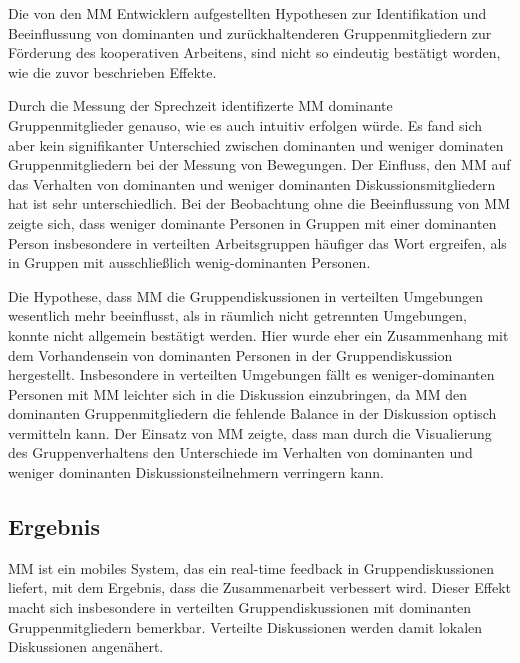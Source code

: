 Die von den MM Entwicklern aufgestellten Hypothesen zur Identifikation und
Beeinflussung von dominanten und zurückhaltenderen Gruppenmitgliedern zur
Förderung des kooperativen Arbeitens, sind nicht so eindeutig bestätigt worden,
wie die zuvor beschrieben Effekte.

Durch die Messung der Sprechzeit identifizerte MM dominante Gruppenmitglieder
genauso, wie es auch intuitiv erfolgen würde. Es fand sich aber kein
signifikanter Unterschied zwischen dominanten und weniger dominaten
Gruppenmitgliedern bei der Messung von Bewegungen.
Der Einfluss, den MM auf das Verhalten von dominanten und weniger dominanten
Diskussionsmitgliedern hat ist sehr unterschiedlich.
Bei der Beobachtung ohne die Beeinflussung von MM zeigte sich, dass weniger
dominante Personen in Gruppen mit einer dominanten Person insbesondere in
verteilten Arbeitsgruppen häufiger das Wort ergreifen, als in Gruppen mit
ausschließlich wenig-dominanten Personen.

Die Hypothese, dass MM die Gruppendiskussionen in verteilten Umgebungen
wesentlich mehr beeinflusst, als in räumlich nicht getrennten Umgebungen, konnte
nicht allgemein bestätigt werden. Hier wurde eher ein Zusammenhang mit dem
Vorhandensein von dominanten Personen in der Gruppendiskussion hergestellt.
Insbesondere in verteilten Umgebungen fällt es weniger-dominanten Personen mit
MM leichter sich in die Diskussion einzubringen, da MM den dominanten
Gruppenmitgliedern die fehlende Balance in der Diskussion optisch vermitteln
kann. 
Der Einsatz von MM zeigte, dass man durch die Visualierung des Gruppenverhaltens
den Unterschiede im Verhalten von dominanten und weniger dominanten
Diskussionsteilnehmern verringern kann.

\subsection{Ergebnis}
MM ist ein mobiles System, das ein real-time feedback in Gruppendiskussionen
liefert, mit dem Ergebnis, dass die Zusammenarbeit verbessert wird.
Dieser Effekt macht sich insbesondere in verteilten Gruppendiskussionen mit
dominanten Gruppenmitgliedern bemerkbar. Verteilte Diskussionen werden damit
lokalen Diskussionen angenähert.


